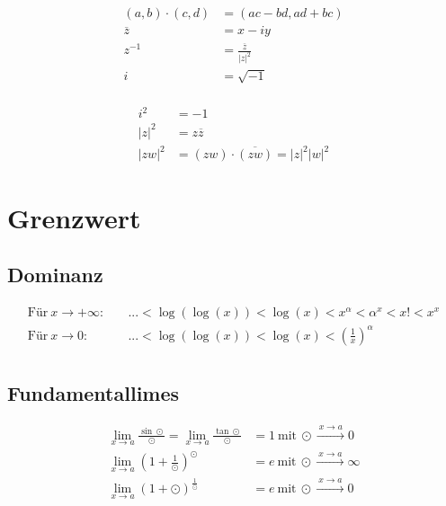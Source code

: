 \documentclass[11pt]{article}
\begin{document}
\begin{minipage}[c]{0.5\textwidth}
\begin{equation*}
\begin{split}
	(a,b) \cdot (c, d) & = (ac-bd, ad+bc) \\
	\overline{z} & = x - iy\\
	z^{-1} & = \frac{\overline{z}}{|z|^2} \\
	i & = \sqrt{-1}\\
\end{split}
\end{equation*}
\end{minipage}
%
\begin{minipage}[c]{0.5\textwidth}
\begin{equation*}
\begin{split}
	i^2 & = -1 \\
	|z|^2 & = z\overline{z} \\
	|zw|^2 & = (zw) \cdot \overline{(zw)} = |z|^2|w|^2
\end{split}
\end{equation*}
\end{minipage}

\section{Grenzwert}

\subsection{Dominanz}

\begin{equation*}
\begin{split}
	\text{F{\"u}r}\ x \to +\infty:\quad & ... < \log(\log(x)) < \log(x) < x^\alpha < \alpha^x < x! < x^x \\
	\text{F{\"u}r}\ x \to 0:\quad & ... < \log(\log(x)) < \log(x) < (\frac{1}{x})^\alpha \\
\end{split}
\end{equation*}

\subsection{Fundamentallimes}

\begin{equation*}
\begin{split}
	\lim_{x \to a} \frac{\sin \odot}{\odot} = \lim_{x \to a} \frac{\tan \odot}{\odot} & = 1\ \text{mit}\ \odot \xrightarrow{\: x \to a \: } 0 \\ 
	\lim_{x \to a} (1 + \frac{1}{\odot})^\odot & = e\ \text{mit}\ \odot \xrightarrow{\: x \to a \: } \infty \\ 
	\lim_{x \to a} (1 + \odot)^\frac{1}{\odot} & = e\ \text{mit}\ \odot \xrightarrow{\: x \to a \: } 0 \\ 
\end{split}
\end{equation*}
\end{document}
